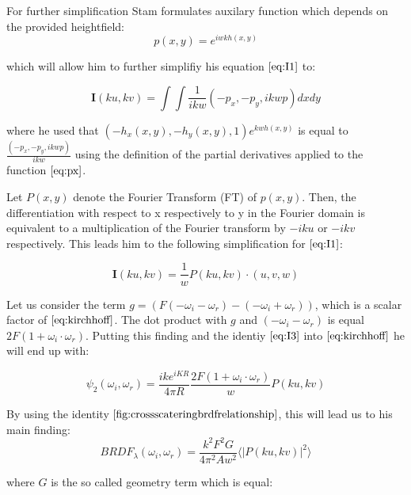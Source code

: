 For further simplification Stam formulates auxilary function which depends on the provided heightfield: 
\begin{equation}
  p(x,y) = e^{iwkh(x,y)} 
\label{eq:px}
\end{equation}

which will allow him to further simplifiy his equation $\ref{eq:I1}$ to:

\begin{equation}
    \mathbf{I}(ku, kv) = \int \int \frac{1}{ikw}(-p_x, -p_y, ikwp) dx dy
\label{eq:I2}
\end{equation}

where he used that $(-h_{x}(x,y), -h_{y}(x,y), 1)e^{kwh(x,y)}$ is equal to $\frac{(-p_x, -p_y, ikwp)}{ikw}$ using the definition of the partial derivatives applied to the function $\ref{eq:px}$.

Let $P(x,y)$ denote the Fourier Transform (FT) of $p(x,y)$. Then, the differentiation with respect to x respectively to y in the Fourier domain is equivalent to a multiplication of the Fourier transform by $-iku$ or $-ikv$ respectively. This leads him to the following simplification for $\ref{eq:I1}$:

\begin{equation}
    \mathbf{I}(ku, kv) = \frac{1}{w}P(ku, kv) \cdot (u,v,w)
\label{eq:I3}
\end{equation}

Let us consider the term $g = (F(-\omega_i - \omega_r)-(-\omega_i + \omega_r))$, which is a scalar factor of $\ref{eq:kirchhoff}$. The dot product with $g$ and $(-\omega_i - \omega_r)$ is equal $2F(1 + \omega_i \cdot \omega_r)$. Putting this finding and the identiy $\ref{eq:I3}$ into $\ref{eq:kirchhoff}$ he will end up with:

\begin{equation}
\psi_{2}(\omega_i, \omega_r) = \frac{i k e^{i K R}}{4 \pi R} \frac{2F(1 + \omega_i \cdot \omega_r)}{w} P(ku, kv)
\label{eq:kirchhoffFinding}
\end{equation}

By using the identity $\ref{fig:crossscateringbrdfrelationship}$, this will lead us to his main finding:
\begin{equation} 
  BRDF_{\lambda}(\omega_i, \omega_r) = \frac{k^2 F^2 G}{4\pi^2 A w^2} \langle \left|P(ku, kv)\right|^2\rangle
\label{eq:mainstam}
\end{equation}

where $G$ is the so called geometry term which is equal: 

